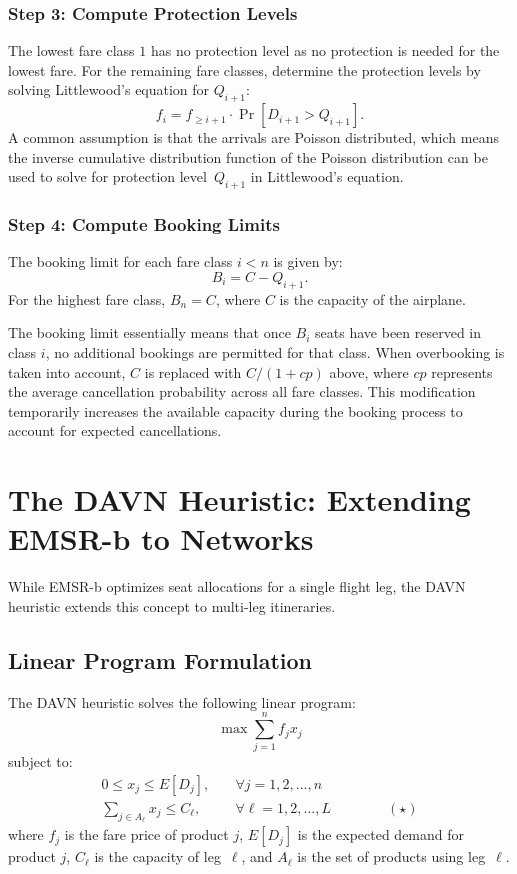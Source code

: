 \documentclass{article}
\begin{document}
\subsubsection*{Step 3: Compute Protection Levels}
The lowest fare class $1$ has no protection level as no protection is needed for 
the lowest fare.
For the remaining fare classes, determine the protection levels by solving 
Littlewood’s equation for $Q_{i+1}$:
\[
    f_i = f_{\geq i+1} \cdot \Pr[D_{i+1} > Q_{i+1}].
\]
A common assumption is that the arrivals are Poisson distributed, which means 
the inverse cumulative distribution function of the Poisson distribution can be 
used to solve for protection level~$Q_{i+1}$ in Littlewood's equation.

\subsubsection*{Step 4: Compute Booking Limits}
The booking limit for each fare class $i<n$ is given by:
\[
    B_i = C - Q_{i+1}.
\]
For the highest fare class, $B_n = C$, where $C$ is the capacity of the 
airplane.

The booking limit essentially means that once $B_i$ seats have been reserved in 
class $i$, no additional bookings are permitted for that class. When overbooking 
is taken into account, $C$ is replaced with $C / (1 + cp)$ above, where $cp$ 
represents the average cancellation probability across all fare classes. This 
modification temporarily increases the available capacity during the booking 
process to account for expected cancellations.

\section{The DAVN Heuristic: Extending EMSR-b to Networks}
While EMSR-b optimizes seat allocations for a single flight leg, the DAVN 
heuristic extends this concept to multi-leg itineraries.

\subsection{Linear Program Formulation}
The DAVN heuristic solves the following linear program:
\[
    \max \sum_{j=1}^{n} f_j x_j
\]
subject to:
\begin{align*}
    0 \leq x_j \leq E[D_j], \quad &\forall j = 1, 2, ..., n\\
    \sum_{j \in A_\ell} x_j \leq C_\ell,\quad &\forall \ell = 1, 2, ..., L 
\qquad\qquad (\star)
\end{align*}
where $f_j$ is the fare price of product $j$, $E[D_j]$ is the expected demand 
for product $j$, $C_\ell$ is the capacity of leg~$\ell$, and $A_\ell$ is the set 
of products using leg~$\ell$.
\end{document}
